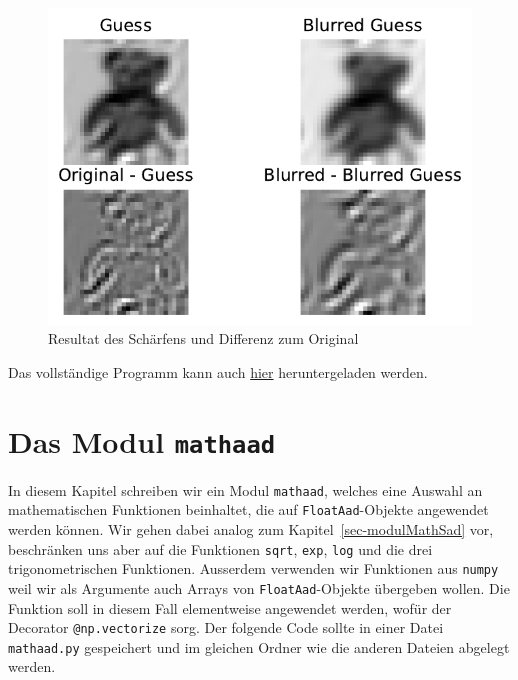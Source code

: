 \documentclass[
  a4paper,
  DIV=11]{scrreprt}
\theoremstyle{definition}
\theoremstyle{definition}
\theoremstyle{remark}
\begin{document}
\begin{figure}[H]

{\centering \includegraphics{aad_files/figure-pdf/fig-imagereconstructionresult-output-1.pdf}

}

\caption{\label{fig-imagereconstructionresult}Resultat des Schärfens und
Differenz zum Original}

\end{figure}

Das vollständige Programm kann auch \href{deblurImage.py}{hier}
heruntergeladen werden.

\hypertarget{sec-modulMathAad}{%
\section{\texorpdfstring{Das Modul
\texttt{mathaad}}{Das Modul mathaad}}\label{sec-modulMathAad}}

In diesem Kapitel schreiben wir ein Modul \texttt{mathaad}, welches eine
Auswahl an mathematischen Funktionen beinhaltet, die auf
\texttt{FloatAad}-Objekte angewendet werden können. Wir gehen dabei
analog zum Kapitel~\ref{sec-modulMathSad} vor, beschränken uns aber auf
die Funktionen \texttt{sqrt}, \texttt{exp}, \texttt{log} und die drei
trigonometrischen Funktionen. Ausserdem verwenden wir Funktionen aus
\texttt{numpy} weil wir als Argumente auch Arrays von
\texttt{FloatAad}-Objekte übergeben wollen. Die Funktion soll in diesem
Fall elementweise angewendet werden, wofür der Decorator
\texttt{@np.vectorize} sorg. Der folgende Code sollte in einer Datei
\texttt{mathaad.py} gespeichert und im gleichen Ordner wie die anderen
Dateien abgelegt werden.
\end{document}
